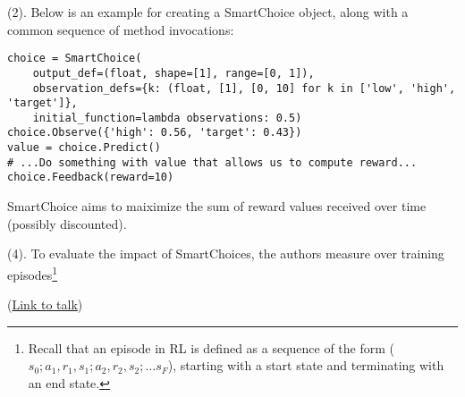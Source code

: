 \documentclass[11pt]{article}
\begin{document}



 (2). Below is an example for creating a SmartChoice object, along with a common sequence of method invocations:

\lstset{language=Python}
\begin{lstlisting}
choice = SmartChoice(
	output_def=(float, shape=[1], range=[0, 1]),
	observation_defs={k: (float, [1], [0, 10] for k in ['low', 'high', 'target']}, 
	initial_function=lambda observations: 0.5)
choice.Observe({'high': 0.56, 'target': 0.43})
value = choice.Predict()
# ...Do something with value that allows us to compute reward...
choice.Feedback(reward=10)
\end{lstlisting}

SmartChoice aims to maiximize the sum of reward values received over time (possibly discounted). 


 (4). To evaluate the impact of SmartChoices, the authors measure  over training episodes\footnote{Recall that an episode in RL is defined as a sequence of the form ($s_0; a_1, r_1, s_1; a_2, r_2, s_2; \ldots s_F$), starting with a start state and terminating with an end state.}






(\href{https://youtu.be/N5x48g2sp8M}{Link to talk})
\end{document}
